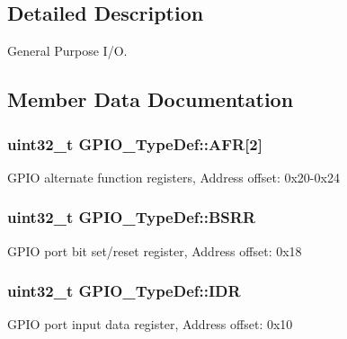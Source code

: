 \subsection{Detailed Description}
General Purpose I/O. 

\subsection{Member Data Documentation}
\subsubsection[{\texorpdfstring{A\+FR}{AFR}}]{ uint32\+\_\+t G\+P\+I\+O\+\_\+\+Type\+Def\+::\+A\+FR\mbox{[}2\mbox{]}}\hypertarget{struct_g_p_i_o___type_def_a2245603433e102f0fd8a85f7de020755}{}\label{struct_g_p_i_o___type_def_a2245603433e102f0fd8a85f7de020755}
G\+P\+IO alternate function registers, Address offset\+: 0x20-\/0x24 
\subsubsection[{\texorpdfstring{B\+S\+RR}{BSRR}}]{ uint32\+\_\+t G\+P\+I\+O\+\_\+\+Type\+Def\+::\+B\+S\+RR}\hypertarget{struct_g_p_i_o___type_def_acd6f21e08912b484c030ca8b18e11cd6}{}\label{struct_g_p_i_o___type_def_acd6f21e08912b484c030ca8b18e11cd6}
G\+P\+IO port bit set/reset register, Address offset\+: 0x18 
\subsubsection[{\texorpdfstring{I\+DR}{IDR}}]{ uint32\+\_\+t G\+P\+I\+O\+\_\+\+Type\+Def\+::\+I\+DR}\hypertarget{struct_g_p_i_o___type_def_acf11156409414ad8841bb0b62959ee96}{}\label{struct_g_p_i_o___type_def_acf11156409414ad8841bb0b62959ee96}
G\+P\+IO port input data register, Address offset\+: 0x10 
